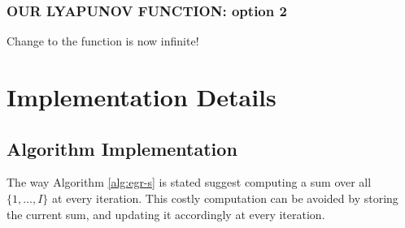 \documentclass[11pt]{article}
\begin{document}
\subsubsection{OUR LYAPUNOV FUNCTION: option 2}

Change to the function is now infinite!




\section{Implementation Details}

\subsection{Algorithm Implementation}

The way Algorithm \ref{alg:egr-s} is stated suggest computing a sum over all $\{1, \ldots ,I \} $ at every iteration. This costly computation can be avoided by storing the current sum, and updating it accordingly at every iteration. 
%
%
\end{document}
